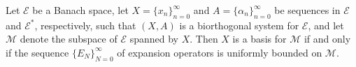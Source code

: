 Let $\mathcal{E}$ be a Banach space, let $X = \{x_n\}_{n=0}^{\infty}$ and $A = \{\alpha_n\}_{n=0}^{\infty}$ be sequences in $\mathcal{E}$ and $\mathcal{E}^*$, respectively, such that $(X, A)$ is a biorthogonal system for $\mathcal{E}$, and let $\mathcal{M}$ denote the subspace of $\mathcal{E}$ spanned by $X$. Then $X$ is a basis for $\mathcal{M}$ if and only if the sequence $\{E_N\}_{N=0}^{\infty}$ of expansion operators is uniformly bounded on $\mathcal{M}$.
